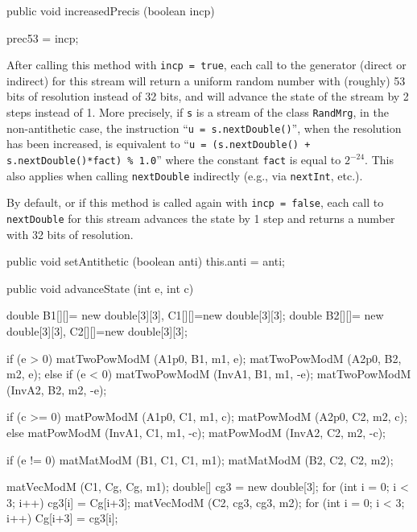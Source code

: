 \begin{code}

   public void increasedPrecis (boolean incp) \begin{hide} {
      prec53 = incp;
   }\end{hide}
\end{code}
 \begin{tabb} After calling this method with \texttt{incp = true}, each call to 
  the generator (direct or indirect) for this stream 
  will return a uniform random number with (roughly) 53 bits of resolution 
  instead of 32 bits,
  and will advance the state of the stream by 2 steps instead of 1.  
  More precisely, if \texttt{s} is a stream of the class \texttt{RandMrg},
  in the non-antithetic case, the instruction
  ``\texttt{u = s.nextDouble()}'', when the resolution has been increased,
  is equivalent to
  ``\texttt{u = (s.nextDouble() + s.nextDouble()*fact) \%\ 1.0}'' 
  where the constant \texttt{fact} is equal to $2^{-24}$.
  This also applies when calling \texttt{nextDouble} indirectly
  (e.g., via \texttt{nextInt}, etc.).

  By default, or if this method is called again with \texttt{incp = false}, 
  each call to \texttt{nextDouble} for this stream advances the state by 1 step
  and returns a number with 32 bits of resolution.
 \end{tabb}
\begin{htmlonly}
\end{htmlonly}
\begin{code}\begin{hide}

   public void setAntithetic (boolean anti)  {
      this.anti = anti;
   }\end{hide}

   public void advanceState (int e, int c) \begin{hide} {
      double B1[][]= new double[3][3], C1[][]=new double[3][3];
      double B2[][]= new double[3][3], C2[][]=new double[3][3];

      if (e > 0) {
          matTwoPowModM (A1p0, B1, m1, e);
          matTwoPowModM (A2p0, B2, m2, e);
      } else if (e < 0) {
          matTwoPowModM (InvA1, B1, m1, -e);
          matTwoPowModM (InvA2, B2, m2, -e);
      }

      if (c >= 0) {
          matPowModM (A1p0, C1, m1, c);
          matPowModM (A2p0, C2, m2, c);
      } else {
          matPowModM (InvA1, C1, m1, -c);
          matPowModM (InvA2, C2, m2, -c);
      }

      if (e != 0) {
          matMatModM (B1, C1, C1, m1);
          matMatModM (B2, C2, C2, m2);
      }

      matVecModM (C1, Cg, Cg, m1);
      double[] cg3 = new double[3];
      for (int i = 0; i < 3; i++)  cg3[i] = Cg[i+3];
      matVecModM (C2, cg3, cg3, m2);
      for (int i = 0; i < 3; i++)  Cg[i+3] = cg3[i];
   }\end{hide}
\end{code}
